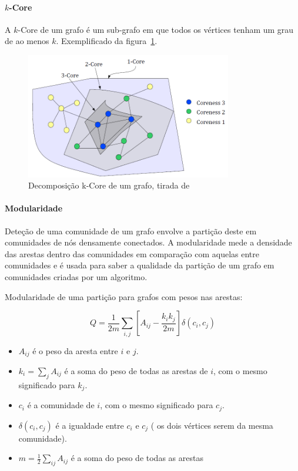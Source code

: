 \paragraph{$k$-Core}
A $k$-Core de um grafo é um sub-grafo em que todos os vértices tenham um grau de ao menos $k$. Exemplificado da figura~\ref{fig:gekCore}.

\begin{figure}
\centering
\caption{Decomposição k-Core de um grafo, tirada de~\cite{kCoreDis}}
\label{fig:gekCore}
\includegraphics[width=90mm]{kCoreExample}
\end{figure}

\paragraph{Modularidade}
Deteção de uma comunidade de um grafo envolve a partição deste em comunidades de nós densamente conectados. A modularidade mede a densidade das arestas dentro das comunidades em comparação com aquelas entre comunidades e é usada para saber a qualidade da partição de um grafo em comunidades criadas por um algoritmo. 


Modularidade de uma partição para grafos com pesos nas arestas:

\begin{equation}
Q = \frac{1}{2m} \sum_{i,j} [ A_{ij} - \frac{k_i k_j}{2m} ] \delta(c_i ,c_j)
\label{eq:MN}
\end{equation}


\begin{itemize}
	\item $A_{ij}$ é o peso da aresta entre $i$ e $j$.
	\item $k_i = \sum_j A_{ij}$ é a soma do peso de todas as arestas de $i$, com o mesmo significado para $k_j$.
	\item $c_i$ é a comunidade de $i$, com o mesmo significado para $c_j$.
	\item $\delta(c_i,c_j)$ é a igualdade entre $c_i$ e $c_j$ ( os dois vértices serem da mesma comunidade).
	\item $m = \frac{1}{2}\sum_{ij} A_{ij}$ é a soma do peso de todas as arestas %
\end{itemize}






